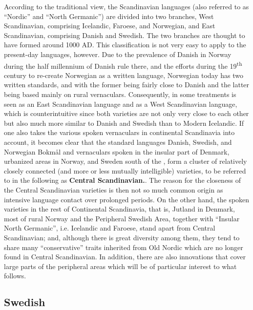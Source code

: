 According to the traditional view, the Scandinavian languages (also referred to as “Nordic” and “North Germanic”) are divided into two branches, West Scandinavian, comprising Icelandic, Faroese, and Norwegian, and East Scandinavian, comprising Danish and Swedish. The two branches are thought to have formed around 1000 AD. This classification is not very easy to apply to the present-day languages, however. Due to the prevalence of Danish in Norway during the half millennium of Danish rule there, and the efforts during the 19\textsuperscript{th} century to re-create Norwegian as a written language, Norwegian today has two written standards,  and  with the former being fairly close to Danish and the latter being based mainly on rural vernaculars. Consequently, in some treatments  is seen as an East Scandinavian language and  as a West Scandinavian language, which is counterintuitive since both varieties are not only very close to each other but also much more similar to Danish and Swedish than to Modern Icelandic. If one also takes the various spoken vernaculars in continental Scandinavia into account, it becomes clear that the standard languages Danish, Swedish, and Norwegian Bokmål and vernaculars spoken in the insular part of Denmark, urbanized areas in Norway, and Sweden south of the , form a cluster of relatively closely connected (and more or less mutually intelligible) varieties, to be referred to in the following as \textbf{Central Scandinavian}\textbf{.}. The reason for the closeness of the Central Scandinavian varieties is then not so much common origin as intensive language contact over prolonged periods. On the other hand, the spoken varieties in the rest of Continental Scandinavia, that is, Jutland in Denmark, most of rural Norway and the Peripheral Swedish Area, together with “Insular North Germanic”, i.e. Icelandic and Faroese, stand apart from Central Scandinavian; and, although there is great diversity among them, they tend to share many “conservative” traits inherited from Old Nordic which are no longer found in Central Scandinavian. In addition, there are also innovations that cover large parts of the peripheral areas which will be of particular interest to what follows. 

\subsection{ Swedish}
\label{bkm:Ref108607742}


